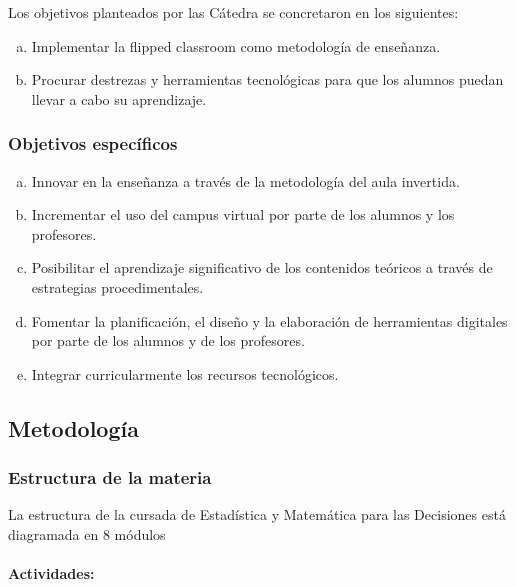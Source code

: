 \documentclass[oneside,spanish]{amsart}
\numberwithin{equation}{section}
\numberwithin{figure}{section}
\theoremstyle{definition}
\begin{document}
Los objetivos planteados por las Cátedra se concretaron en los siguientes: 

\begin{enumerate}[a.]
	\item Implementar la flipped classroom como metodología de enseñanza.
	
	\item Procurar destrezas y herramientas tecnológicas para que los alumnos puedan llevar a cabo su aprendizaje. 
\end{enumerate}

\subsubsection{Objetivos específicos}

\begin{enumerate}[a.]
	\item Innovar en la enseñanza a través de la metodología del aula invertida.
	
	\item Incrementar el uso del campus virtual por parte de los alumnos y los profesores. 
	
	\item Posibilitar el aprendizaje significativo de los contenidos teóricos a través de estrategias procedimentales. 
	
	\item Fomentar la planificación, el diseño y la elaboración de herramientas digitales por parte de los alumnos y de los profesores.
	
	\item Integrar curricularmente los recursos tecnológicos.
\end{enumerate}

\subsection{Metodología}

\subsubsection{Estructura de la materia}

La estructura de la cursada de Estadística y Matemática para las Decisiones está diagramada en 8 módulos

\paragraph{Actividades:}
\end{document}
